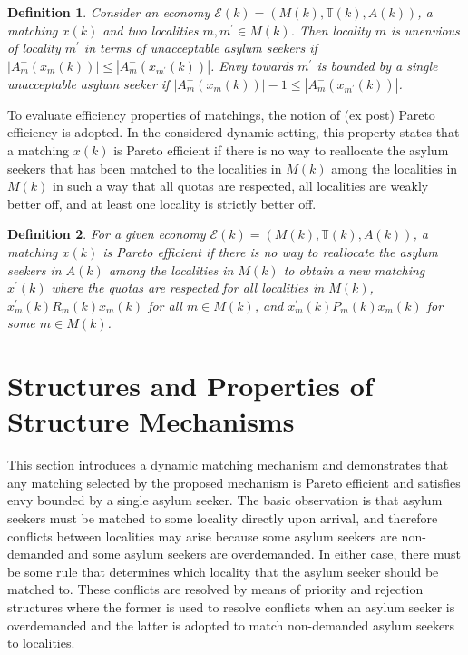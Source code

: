 \documentclass[12pt,fleqn]{article}
\newtheorem{definition}{Definition}
\begin{document}
\begin{definition}\rm\label{DEF:1-Envy_UNACC}
Consider an economy $\mathcal{E}(k)=(M(k),\mathbb{T}(k),A(k))$, a matching $x(k)$ and two localities $m,m^\prime\in M(k)$. Then locality $m$ is unenvious of locality $m^\prime$ in terms of unacceptable asylum seekers if $|A_m^-(x_m(k))|\leq |A_m^-(x_{m^\prime}(k))|$. Envy towards $m^\prime$ is bounded by a single unacceptable asylum seeker if $|A_m^-(x_m(k))|-1\leq |A_m^-(x_{m^\prime}(k))|$.
\end{definition}
\noindent To evaluate efficiency properties of matchings, the notion of (ex post) Pareto efficiency is adopted. In the considered dynamic setting, this property states that a matching $x(k)$ is Pareto efficient if there is no way to reallocate the asylum seekers that has been matched to the localities in $M(k)$ among the localities in $M(k)$ in such a way that all quotas are respected, all localities are weakly better off, and at least one locality is strictly better off.
\begin{definition}\rm\label{DEF:Efficiency}
For a given economy $\mathcal{E}(k)=(M(k),\mathbb{T}(k),A(k))$, a matching $x(k)$ is Pareto efficient if there is no way to reallocate the asylum seekers in $A(k)$ among the localities in $M(k)$ to obtain a new matching $x^\prime(k)$ where the quotas are respected for all localities in $M(k)$, $x_m^\prime(k)R_m(k) x_m(k)$ for all $m\in M(k)$, and $x_m^\prime(k)P_m(k) x_m(k)$ for some $m\in M(k)$.
\end{definition}

\section{Structures and Properties of Structure Mechanisms}\label{SEC:Structure_Mechanisms}
This section introduces a dynamic matching mechanism and demonstrates that any matching selected by the proposed mechanism is Pareto efficient and satisfies envy bounded by a single asylum seeker. The basic observation is that asylum seekers must be matched to some locality directly upon arrival, and therefore conflicts between localities may arise because some asylum seekers are non-demanded and some asylum seekers are overdemanded. In either case, there must be some rule that determines which locality that the asylum seeker should be matched to. These conflicts are resolved by means of priority and rejection structures where the former is used to resolve conflicts when an asylum seeker is overdemanded and the latter is adopted to match non-demanded asylum seekers to localities.
\end{document}
